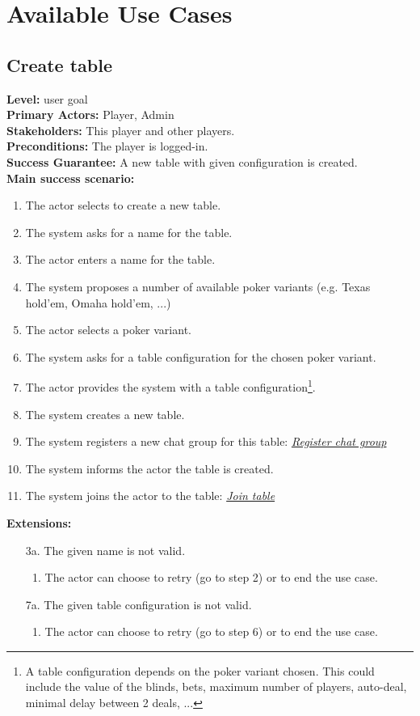 \documentclass[a4paper,11pt]{report}
\begin{document}
\section{Available Use Cases}
\subsection{Create table}
\textbf{Level:} user goal \\
\textbf{Primary Actors:} Player, Admin \\
\textbf{Stakeholders:} This player and other players.\\
\textbf{Preconditions:} The player is logged-in.\\
\textbf{Success Guarantee:} A new table with given configuration is created. \\
\textbf{Main success scenario:} 
\begin{enumerate}
\item The actor selects to create a new table.
\item The system asks for a name for the table.
\item The actor enters a name for the table.
\item The system proposes a number of available poker variants (e.g. Texas hold'em, Omaha hold'em, ...)
\item The actor selects a poker variant. 
\item The system asks for a table configuration for the chosen poker variant.
\item The actor provides the system with a table configuration\footnote{A table configuration depends on the poker variant chosen. This could include the value of the blinds, bets, maximum number of players, auto-deal, minimal delay between 2 deals, ...}.
\item The system creates a new table. 
\item The system registers a new chat group for this table: \emph{\underline{Register chat group}}
\item The system informs the actor the table is created.
\item The system joins the actor to the table:  \emph{\underline{Join table}}
\end{enumerate}
\textbf{Extensions:}
\begin{itemize}
\item[3a.] The given name is not valid.
\begin{enumerate}
\item The actor can choose to retry (go to step 2) or to end the use case. 
\end{enumerate}
\item[7a.] The given table configuration is not valid. 
\begin{enumerate}
\item The actor can choose to retry (go to step 6) or to end the use case. 
\end{enumerate}
\end{itemize}
\end{document}
